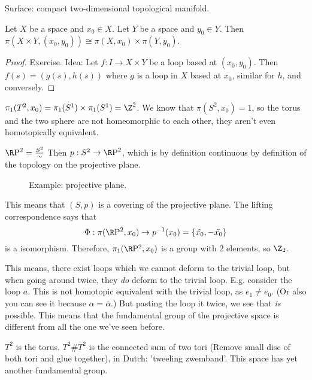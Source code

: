 \begin{definition}[Surface]
    Surface: compact two-dimensional topological manifold.
\end{definition}
\begin{theorem}
    Let $X$ be a space and $x_0 \in X$.
    Let $Y$ be a space and $y_0 \in Y$.
    Then $\pi(X\times Y, (x_0, y_0)) \cong \pi(X, x_0) \times  \pi(Y, y_0)$.
\end{theorem}
\begin{proof}
    Exercise. Idea:
    Let $f: I \to X \times Y$ be a loop based at $(x_0, y_0)$. 
    Then $f(s) = (g(s), h(s))$ where  $g$ is a loop in $X$ based at $x_0$, similar for $h$,
    and conversely.
\end{proof}
\begin{eg}
    $\pi_1(T^2, x_0) = \pi_1(S^1) \times \pi_1(S^1) = \Z^2$.
    We know that $\pi(S^2, x_0) = 1$, so the torus and the two sphere are not homeomorphic to each other, they aren't even homotopically equivalent.
\end{eg}
\begin{eg}
    $\R\text{P}^2 = \frac{S^2}{\sim }$ 
    Then $p: S^2 \to \R\text{P}^2$, which is by definition continuous by definition of the topology on the projective plane.

\begin{figure}[H]
    \centering
    \caption{Example: projective plane.}
    \label{fig:projective-plane-example}
\end{figure}
This means that $(S, p)$ is a covering of the projective plane.
The lifting correspondence says that
\[
    \Phi: \pi(\R \mathrm P^2, x_0) \to p^{-1}(x_0) = \{ \tilde{x_0}, -\tilde{x_0}\} 
\] 
is a isomorphism.
Therefore, $\pi_1(\R \mathrm P^2, x_0)$ is a group with 2 elements, so $\Z_2$.

This means, there exist loops which we cannot deform to the trivial loop, but when going around twice, they \emph{do} deform to the trivial loop.
E.g. consider the loop $a$. This is not homotopic equivalent with the trivial loop, as $e_1 \neq e_0$. (Or also you can see it because $\alpha = \overline{\alpha}$.)
But pasting the loop it twice, we see that \emph{is} possible.
This means that the fundamental group of the projective space is different from all the one we've seen before.
\end{eg}

\begin{eg}
    $T^2$ is the torus.
    $T^2 \# T^2$ is the connected sum of two tori (Remove small disc of both tori and glue together), in Dutch: 'tweeling zwemband'. 
    This space has yet another fundamental group.
\end{eg}

